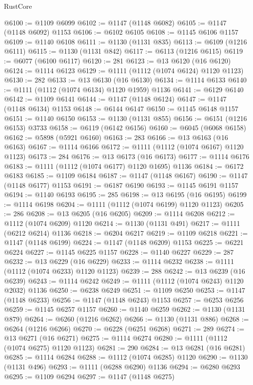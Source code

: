 \begin{lexlean}{RustCore}
\begin{coremodule}
@6100 := @1109 @6099
@6102 := @1147 (@1148 @6082)
@6105 := @1147 (@1148 @6092) @1153
@6106 := @6102 @6105
@6108 := @1145 @6106 @1157
@6109 := @1140 @6108
@6111 := @1130 (@1131 @835)
@6113 := @6109 (@1216 @6111)
@6115 := @1130 (@1131 @842)
@6117 := @6113 (@1216 @6115)
@6119 := @6077 (@6100 @6117)
@6120 := 281
@6123 := @13 @6120 (@16 @6120)
@6124 := @1114 @6123
@6129 := @1111 (@1112 (@1074 @6124) @1120 @1123)
@6130 := 282
@6133 := @13 @6130 (@16 @6130)
@6134 := @1114 @6133
@6140 := @1111 (@1112 (@1074 @6134) @1120 @1959) @1136
@6141 := @6129 @6140
@6142 := @1109 @6141
@6144 := @1147 (@1148 @6124)
@6147 := @1147 (@1148 @6134) @1153
@6148 := @6144 @6147
@6150 := @1145 @6148 @1157
@6151 := @1140 @6150
@6153 := @1130 (@1131 @855)
@6156 := @6151 (@1216 @6153) @3733
@6158 := @6119 (@6142 @6156)
@6160 := @6045 (@6068 @6158)
@6162 := @5898 (@5921 @6160)
@6163 := 283
@6166 := @13 @6163 (@16 @6163)
@6167 := @1114 @6166
@6172 := @1111 (@1112 (@1074 @6167) @1120 @1123)
@6173 := 284
@6176 := @13 @6173 (@16 @6173)
@6177 := @1114 @6176
@6183 := @1111 (@1112 (@1074 @6177) @1120 @1695) @1136
@6184 := @6172 @6183
@6185 := @1109 @6184
@6187 := @1147 (@1148 @6167)
@6190 := @1147 (@1148 @6177) @1153
@6191 := @6187 @6190
@6193 := @1145 @6191 @1157
@6194 := @1140 @6193
@6195 := 285
@6198 := @13 @6195 (@16 @6195)
@6199 := @1114 @6198
@6204 := @1111 (@1112 (@1074 @6199) @1120 @1123)
@6205 := 286
@6208 := @13 @6205 (@16 @6205)
@6209 := @1114 @6208
@6212 := @1112 (@1074 @6209) @1120
@6214 := @1130 (@1131 @491)
@6217 := @1111 (@6212 @6214) @1136
@6218 := @6204 @6217
@6219 := @1109 @6218
@6221 := @1147 (@1148 @6199)
@6224 := @1147 (@1148 @6209) @1153
@6225 := @6221 @6224
@6227 := @1145 @6225 @1157
@6228 := @1140 @6227
@6229 := 287
@6232 := @13 @6229 (@16 @6229)
@6233 := @1114 @6232
@6238 := @1111 (@1112 (@1074 @6233) @1120 @1123)
@6239 := 288
@6242 := @13 @6239 (@16 @6239)
@6243 := @1114 @6242
@6249 := @1111 (@1112 (@1074 @6243) @1120 @2032) @1136
@6250 := @6238 @6249
@6251 := @1109 @6250
@6253 := @1147 (@1148 @6233)
@6256 := @1147 (@1148 @6243) @1153
@6257 := @6253 @6256
@6259 := @1145 @6257 @1157
@6260 := @1140 @6259
@6262 := @1130 (@1131 @879)
@6264 := @6260 (@1216 @6262)
@6266 := @1130 (@1131 @886)
@6268 := @6264 (@1216 @6266)
@6270 := @6228 (@6251 @6268)
@6271 := 289
@6274 := @13 @6271 (@16 @6271)
@6275 := @1114 @6274
@6280 := @1111 (@1112 (@1074 @6275) @1120 @1123)
@6281 := 290
@6284 := @13 @6281 (@16 @6281)
@6285 := @1114 @6284
@6288 := @1112 (@1074 @6285) @1120
@6290 := @1130 (@1131 @496)
@6293 := @1111 (@6288 @6290) @1136
@6294 := @6280 @6293
@6295 := @1109 @6294
@6297 := @1147 (@1148 @6275)

\end{coremodule}
\end{lexlean}
